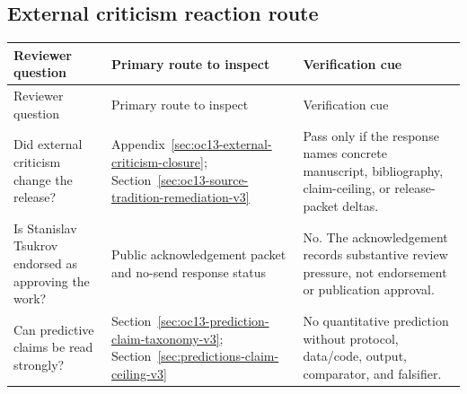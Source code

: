 \subsection{External criticism reaction route}
\label{sec:oc13-reviewer-navigation-external-criticism-v3}

\begin{longtable}{@{}p{}p{}p{}@{}}
\toprule
Reviewer question & Primary route to inspect & Verification cue \\
\midrule
\endfirsthead
\toprule
Reviewer question & Primary route to inspect & Verification cue \\
\midrule
\endhead
Did external criticism change the release? & Appendix~\ref{sec:oc13-external-criticism-closure}; Section~\ref{sec:oc13-source-tradition-remediation-v3} & Pass only if the response names concrete manuscript, bibliography, claim-ceiling, or release-packet deltas. \\
Is Stanislav Tsukrov endorsed as approving the work? & Public acknowledgement packet and no-send response status & No. The acknowledgement records substantive review pressure, not endorsement or publication approval. \\
Can predictive claims be read strongly? & Section~\ref{sec:oc13-prediction-claim-taxonomy-v3}; Section~\ref{sec:predictions-claim-ceiling-v3} & No quantitative prediction without protocol, data/code, output, comparator, and falsifier. \\
\bottomrule
\end{longtable}

\clearpage
